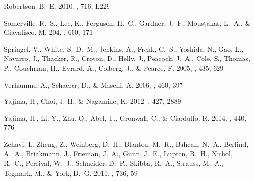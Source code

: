 \documentclass{emulateapj}
\begin{document}
\begin{thebibliography}{39}
{Robertson}, B.~E. 2010, \apjl, 716, L229



{Somerville}, R.~S., {Lee}, K., {Ferguson}, H.~C.,
	{Gardner}, J.~P., {Moustakas}, L.~A., \& {Giavalisco}, M. 204, \apj,
  600, 171

{Springel}, V., {White}, S.~D.~M., {Jenkins}, A., {Frenk}, C.~S., {Yoshida},
  N., {Gao}, L., {Navarro}, J., {Thacker}, R., {Croton}, D., {Helly}, J.,
  {Peacock}, J.~A., {Cole}, S., {Thomas}, P., {Couchman}, H., {Evrard}, A.,
  {Colberg}, J., \& {Pearce}, F. 2005, \nat, 435, 629

{Verhamme}, A., {Schaerer}, D., \& {Maselli}, A. 2006, \aap, 460, 397

{Yajima}, H., {Choi}, J.-H., \& {Nagamine}, K. 2012, \mnras, 427, 2889

{Yajima}, H., {Li}, Y., {Zhu}, Q., {Abel}, T., {Gronwall}, C., \& {Ciardullo},
  R. 2014, \mnras, 440, 776

{Zehavi}, I., {Zheng}, Z., {Weinberg}, D.~H., {Blanton}, M.~R., {Bahcall},
  N.~A., {Berlind}, A.~A., {Brinkmann}, J., {Frieman}, J.~A., {Gunn}, J.~E.,
  {Lupton}, R.~H., {Nichol}, R.~C., {Percival}, W.~J., {Schneider}, D.~P.,
  {Skibba}, R.~A., {Strauss}, M.~A., {Tegmark}, M., \& {York}, D.~G. 2011,
  \apj, 736, 59

\end{thebibliography}
\end{document}
